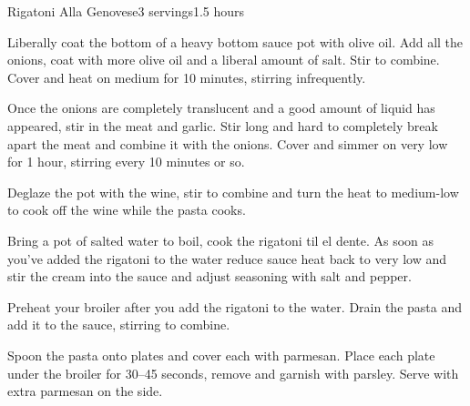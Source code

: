 \documentclass[../Cookbook.tex]{subfiles}
\begin{document}
\begin{recipe}{Rigatoni Alla Genovese}{3 servings}{1.5 hours}

Liberally coat the bottom of a heavy bottom sauce pot with olive oil. Add all the onions, coat with more olive oil and a liberal amount of salt. Stir to combine. Cover and heat on medium for 10 minutes, stirring infrequently.

Once the onions are completely translucent and a good amount of liquid has appeared, stir in the meat and garlic. Stir long and hard to completely break apart the meat and combine it with the onions. Cover and simmer on very low for 1 hour, stirring every 10 minutes or so.

Deglaze the pot with the wine, stir to combine and turn the heat to medium-low to cook off the wine while the pasta cooks.

Bring a pot of salted water to boil, cook the rigatoni til el dente. As soon as you've added the rigatoni to the water reduce sauce heat back to very low and stir the cream into the sauce and adjust seasoning with salt and pepper.

\newstep
Preheat your broiler after you add the rigatoni to the water. Drain the pasta and add it to the sauce, stirring to combine.

Spoon the pasta onto plates and cover each with parmesan.
Place each plate under the broiler for 30--45 seconds, remove and garnish with parsley. Serve with extra parmesan on the side.


\end{recipe}
\end{document}

